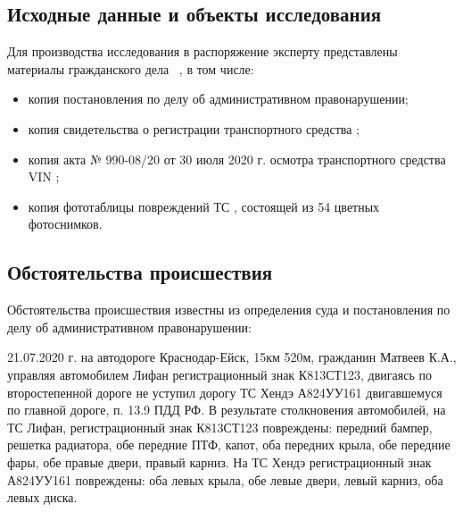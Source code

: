 \setcounter{page}{1}








\subsection{Исходные данные и объекты исследования} 
  
Для производства исследования в распоряжение эксперту представлены материалы гражданского дела \delonum \, \sud, в том числе:
\begin{itemize}
\item копия постановления  по делу об административном правонарушении;
\item копия свидетельства о регистрации транспортного средства ;
\item копия акта № 990-08/20 от 30 июля 2020 г. осмотра транспортного средства  VIN \vin; %
\item копия фототаблицы повреждений ТС , состоящей из 54 цветных фотоснимков.
\end{itemize}
%
\subsection{Обстоятельства происшествия}

Обстоятельства происшествия известны из определения суда и постановления  по делу об административном правонарушении:

 21.07.2020 г. на автодороге Краснодар-Ейск, 	15км 520м, гражданин Матвеев К.А., управляя автомобилем Лифан регистрационный знак К813СТ123, двигаясь по второстепенной дороге не уступил дорогу ТС Хендэ А824УУ161 двигавшемуся по главной дороге, п. 13.9 ПДД РФ.  В результате столкновения автомобилей, на ТС Лифан, регистрационный знак К813СТ123  повреждены: передний бампер, решетка радиатора, обе передние ПТФ, капот, оба передних крыла, обе передние фары, обе правые двери, правый карниз.  На ТС Хендэ регистрационный знак А824УУ161 повреждены: оба левых крыла, обе левые двери, левый карниз, оба левых диска.
%
%
